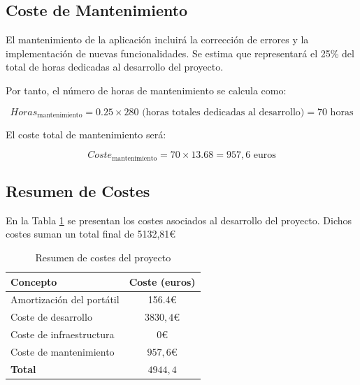 \subsection{Coste de Mantenimiento}
El mantenimiento de la aplicación incluirá la corrección de errores y la implementación de nuevas funcionalidades. Se estima que representará el 25\% del total de horas dedicadas al desarrollo del proyecto.

Por tanto, el número de horas de mantenimiento se calcula como:

\begin{equation*}
    Horas_{\text{mantenimiento}} = 0.25 \times 280\text{ (horas totales dedicadas al desarrollo)} = 70 \text{ horas}
\end{equation*}

El coste total de mantenimiento será:

\begin{equation*}
    Coste_{\text{mantenimiento}} = 70 \times 13.68 = 957,6 \text{ euros}
\end{equation*}
\subsection{Resumen de Costes}
En la Tabla \ref{tab:costes} se presentan los costes asociados al desarrollo del proyecto. Dichos costes suman un total final de 5132,81\euro

\begin{table}[h]
    \centering
    \renewcommand{\arraystretch}{1.3}
    \begin{tabular}{|l|c|}
        \hline
        \textbf{Concepto} & \textbf{Coste (euros)} \\
        \hline
        Amortización del portátil & 156.4\euro \\
        Coste de desarrollo & \( 3830,4\euro \) \\
        Coste de infraestructura & 0\euro \\
        Coste de mantenimiento & \( 957,6\euro \) \\
        \hline
        \textbf{Total} & \( 4944,4 \) \\
        \hline
    \end{tabular}
    \caption{Resumen de costes del proyecto}
    \label{tab:costes}
\end{table}

